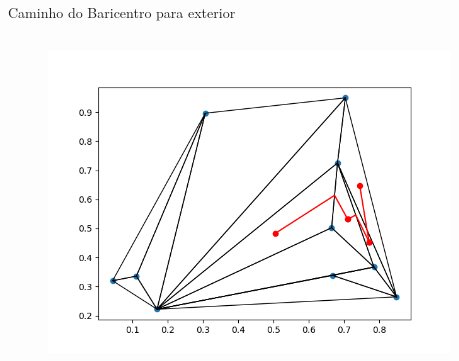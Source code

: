 \documentclass[aspectratio=169,usenames,dvipsnames]{beamer}
\begin{document}
\begin{frame}{Caminho do Baricentro para exterior}
\begin{columns}
\begin{column}{0.5\textwidth}
\begin{figure}
\begin{overprint}
          \includegraphics[width=0.95\textwidth]{./figs/bom_exemplo_2_graham_path.png}
        \end{overprint}
      \end{figure}
    \end{column}
  \end{columns}
  
\end{frame}
\end{document}
